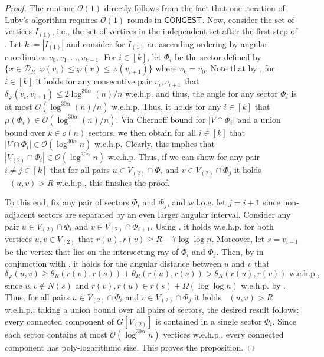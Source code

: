 \documentclass[letterpaper,11pt]{article}
\newcommand{\wehp}{w.e.h.p.\xspace}
\newcommand{\disk}{\ensuremath{\mathcal D_R}\xspace}
\newcommand{\1}{\mathbb I}
\newcommand{\bigO}{\mathcal{O}}
\DeclareMathOperator{\dist}{d_h}
\newcommand{\CONGEST}{\ensuremath{\mathsf{CONGEST}}\xspace}
\newcommand{\angulardist}[2]{\delta_\varphi(#1,#2)}
\begin{document}
%
\begin{proof}
The runtime $\bigO(1)$ directly follows from the fact that one iteration of Luby's algorithm requires $\bigO(1)$ rounds in \CONGEST. Now, consider the set of vertices $I_{(1)}$, i.e., the set of vertices in the independent set after the first step of \algo. Let $k := |I_{(1)}|$ and consider for $I_{(1)}$ an ascending ordering by angular coordinates $v_0, v_1,\dots, v_{k-1}$. For $i \in [k]$, let $\Phi_i$ be the sector defined by $\{x \in \disk : \varphi (v_{i}) \leq \varphi(x) \leq \varphi(v_{i+1})\}$ where $v_k = v_0$. Note that by , for $i \in [k]$ it holds for any consecutive pair $v_i, v_{i+1}$ that $\angulardist{v_{i}}{v_{i+1}} \leq 2 \log^{30\alpha}(n)/n$ \wehp and thus, the angle for any sector $\Phi_i$ is at most $\bigO(\log^{30\alpha}(n)/n)$ \wehp Thus, it holds for any $i \in [k]$ that $\mu(\Phi_i) \in \bigO(\log^{30\alpha}(n)/n)$. Via Chernoff bound for $|V \cap \Phi_i|$ and a union bound over $k \in o(n)$ sectors, we then obtain for all $i \in [k]$ that $|V \cap \Phi_i| \in \bigO(\log^{30\alpha}n)$ \wehp Clearly, this implies that $|V_{(2)} \cap \Phi_i| \in \bigO(\log^{30\alpha}n)$ \wehp Thus, if we can show for any pair $i \neq j \in [k]$ that for all pairs $u \in V_{(2)} \cap \Phi_i$ and $v \in V_{(2)} \cap \Phi_j$ it holds $\dist(u,v) > R$ \wehp, this finishes the proof.

 To this end, fix any pair of sectors $\Phi_i$ and $\Phi_{j}$, and w.l.o.g. let $j = i+1$ since non-adjacent sectors are separated by an even larger angular interval. Consider any pair $u \in V_{(2)} \cap \Phi_i$ and $v \in V_{(2)} \cap \Phi_{i+1}$. Using , it holds \wehp for both vertices $u, v \in V_{(2)}$ that $r(u), r(v) \geq R - 7 \log\log n$. Moreover, let $s = v_{i+1}$ be the vertex that lies on the intersecting ray of $\Phi_i$ and $\Phi_j$. Then, by  in conjunction with , it holds for the angular distance between $u$ and $v$ that
%
$$
\angulardist{u}{v} \geq \theta_R(r(v), r(s)) + \theta_R(r(u), r(s)) > \theta_R(r(u), r(v)) \text{ \wehp,}
$$
%
since $u, v \not\in N(s)$ and $r(v), r(u) \in r(s) + \Omega(\log \log n)$ \wehp by . Thus, for all pairs $u \in V_{(2)} \cap \Phi_i$ and $v \in V_{(2)} \cap \Phi_j$ it holds $\dist(u,v) > R$ \wehp; taking a union bound over all pairs of sectors, the desired result follows: every connected component of $G[V_{(2)}]$ is contained in a single sector $\Phi_i$. Since each sector contains at most $\bigO(\log
^{30\alpha}n)$ vertices \wehp, every connected component has poly-logarithmic size. This proves the proposition.
\end{proof}
\end{document}
